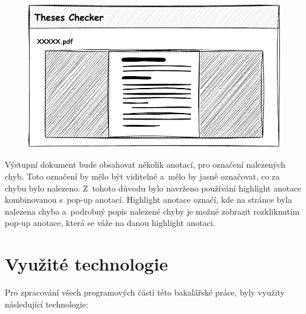 \begin{figure}[H]
    \centering
    \includegraphics[width=0.8\linewidth]{obrazky-figures/Theses_Checker_design-page2.pdf}
    \caption{}
    \label{pic_theses_checker_design_page2}
\end{figure}

Výstupní dokument bude obsahovat několik anotací, pro označení nalezených chyb.
Toto označení by mělo být viditelné a~mělo by jasně označovat, co za chybu bylo
nalezeno. Z~tohoto důvodu bylo navrženo používání highlight anotace kombinovanou
s~pop-up anotací. Highlight anotace označí, kde na stránce byla nalezena chyba
a~podrobný popis nalezené chyby je možné zobrazit rozkliknutím pop-up anotace,
která se váže na danou highlight anotaci.


\section{Využité technologie}
Pro zpracování všech programových částí této bakalářské práce, byly
využity následující technologie:

